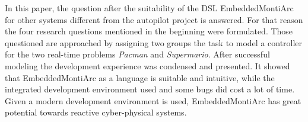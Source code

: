 In this paper, the question after the suitability of the DSL EmbeddedMontiArc for other systems different from the autopilot project is answered. For that reason the four research questions mentioned in the beginning were formulated. Those questioned are approached by assigning two groups the task to model a controller for the two real-time problems \textit{Pacman} and \textit{Supermario}.
After successful modeling the development experience was condensed and presented. It showed that EmbeddedMontiArc as a language is suitable and intuitive, while the integrated development environment used and some bugs did cost a lot of time.
Given a modern development environment is used, EmbeddedMontiArc has great potential towards reactive cyber-physical systems.